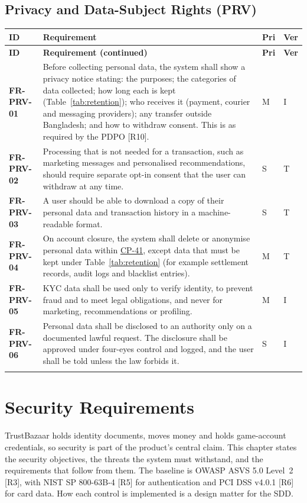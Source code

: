 \documentclass[11pt,a4paper]{report}
\makeatletter
\newenvironment{reqs}{%
  \small
  \begin{longtable}{@{}>{\raggedright\arraybackslash}p{2.35cm}
                       >{\raggedright\arraybackslash}p{10.3cm}
                       >{\centering\arraybackslash}p{0.7cm}
                       >{\centering\arraybackslash}p{0.7cm}@{}}
  \toprule
  \textbf{ID} & \textbf{Requirement} & \textbf{Pri} & \textbf{Ver} \\
  \midrule
  \endfirsthead
  \toprule
  \textbf{ID} & \textbf{Requirement (continued)} & \textbf{Pri} & \textbf{Ver} \\
  \midrule
  \endhead
  \bottomrule
  \endfoot
}{\end{longtable}}
\newcommand{\req}[5]{\leavevmode\textbf{#1}\hypertarget{#1}{} & #5 & #2 & #3 \\ \addlinespace[2pt]}
\newcommand{\cp}[1]{\hyperlink{#1}{#1}}
\makeatother
\begin{document}
\section{Privacy and Data-Subject Rights (PRV)}
\begin{reqs}
\req{FR-PRV-01}{M}{I}{new}{Before collecting personal data, the system shall show a privacy notice stating: the purposes; the categories of data collected; how long each is kept (Table~\ref{tab:retention}); who receives it (payment, courier and messaging providers); any transfer outside Bangladesh; and how to withdraw consent. This is as required by the PDPO [R10].}
\req{FR-PRV-02}{S}{T}{new}{Processing that is not needed for a transaction, such as marketing messages and personalised recommendations, should require separate opt-in consent that the user can withdraw at any time.}
\req{FR-PRV-03}{S}{T}{new}{A user should be able to download a copy of their personal data and transaction history in a machine-readable format.}
\req{FR-PRV-04}{M}{T}{NFR-17}{On account closure, the system shall delete or anonymise personal data within \cp{CP-41}, except data that must be kept under Table~\ref{tab:retention} (for example settlement records, audit logs and blacklist entries).}
\req{FR-PRV-05}{M}{I}{new}{KYC data shall be used only to verify identity, to prevent fraud and to meet legal obligations, and never for marketing, recommendations or profiling.}
\req{FR-PRV-06}{S}{I}{new}{Personal data shall be disclosed to an authority only on a documented lawful request. The disclosure shall be approved under four-eyes control and logged, and the user shall be told unless the law forbids it.}
\end{reqs}
\chapter{Security Requirements}
\label{ch:sec}
TrustBazaar holds identity documents, moves money and holds game-account credentials, so security is part of the product's central claim. This chapter states the security objectives, the threats the system must withstand, and the requirements that follow from them. The baseline is OWASP ASVS 5.0 Level~2 [R3], with NIST SP 800-63B-4 [R5] for authentication and PCI DSS v4.0.1 [R6] for card data. How each control is implemented is a design matter for the SDD.
\end{document}
